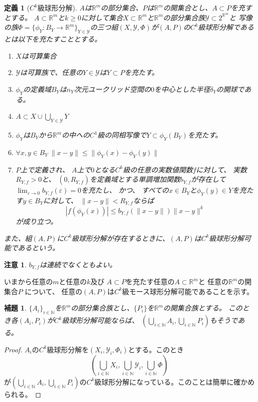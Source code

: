 \documentclass[leqno]{jsarticle}
\newtheorem{lem}[thm]{補題}
\newtheorem{df}[thm]{定義}
\newtheorem*{cau}{注意}
\newcommand{\nn}{\mathbb{N}}
\newcommand{\rr}{\mathbb{R}}
\newcommand{\ep}{\varepsilon}
\begin{document}
\begin{df}[$C^k$級球形分解]$A$は$\rr^m$の部分集合、$P$は$\rr^m$の開集合とし、$A\subset P$を充すとする。
$A\subset \rr^m$と$k\ge 0$に対して集合$X\subset \rr^m$と$\rr^m$の部分集合族$\mathcal{Y}\subset 2^{\rr^m}$と
写像の族$\Phi=\{\phi_Y:B_Y\to \rr^m\}_{Y\in \mathcal{Y}}$の三つ組$(X,\mathcal{Y},\Phi)$が$(A,P)$の$C^k$級球形分解であるとは以下を充たすこととする。
\begin{enumerate}
\item $X$は可算集合
\item $\mathcal{Y}$は可算族で、任意の$Y\in \mathcal{Y}$は$Y\subset P$を充たす。
\item $\phi_Y$の定義域$B_Y$は$n_Y$次元ユークリッド空間の$0$を中心とした半径$\delta_Y$の開球である。
\item $A\subset X\cup \bigcup_{Y\in \mathcal{Y}}Y$
\item $\phi_Y$は$B_Y$から$\rr^m$の中への$C^1$級の同相写像で$Y\subset \phi_Y(B_Y)$を充たす。
\item $\forall x, y\in B_Y\ \|x-y\|\le \|\phi_Y(x)-\phi_Y(y)\|$
\item $P$上で定義され、
$A$上で$0$となる$C^k$級の任意の実数値関数$f$に対して、
実数$R_{Y,f}>0$と、
$(0,R_{Y,f})$を定義域とする単調増加関数$b_{Y,f}$が存在して
$\lim_{\ep\to 0}b_{Y,f}(\ep)=0$を充たし、
かつ、
すべての$x\in B_Y$と$\phi_Y(y)\in Y$を充たす$y\in B_Y$に対して、
$\|x-y\|< R_{Y,f}$ならば
\[
|f(\phi_Y(x))|\le b_{Y,f}(\|x-y\|)\|x-y\|^k
\]
が成り立つ。
\end{enumerate}
また、組$(A,P)$に$C^k$級球形分解が存在するときに、$(A,P)$は$C^k$級球形分解可能であるという。
\end{df}
\begin{cau}
$b_{Y,f}$は連続でなくともよい。
\end{cau}
いまから任意の$m$と任意の$k$及び
$A\subset P$を充たす任意の$A\subset \rr^m$と
任意の$\rr^m$の開集合$P$
について、
任意の$(A,P)$は$C^k$級モース球形分解可能であることを示す。
\begin{lem}\label{cups}
$\{A_i\}_{i\in \nn}$を$\rr^m$の部分集合族とし、$\{P_i\}$を$\rr^m$の開集合族とする。
このとき各$(A_i, P_i)$が$C^k$級球形分解可能ならば、
$\left(\bigcup_{i\in \nn}A_i, \bigcup_{i\in \nn}P_i\right)$もそうである。
\end{lem}
\begin{proof}
$A_i$の$C^k$級球形分解を$(X_i,\mathcal{Y}_i, \Phi_i)$とする。このとき
\[
\left(\bigcup_{i\in \nn}X_i, \bigcup_{i\in \nn}\mathcal{Y}_i, \bigcup_{i\in\nn}\Phi\right)
\]
が$\left(\bigcup_{i\in \nn}A_i, \bigcup_{i\in \nn}P_i\right)$の$C^k$級球形分解になっている。このことは簡単に確かめられる。
\end{proof}
\end{document}

